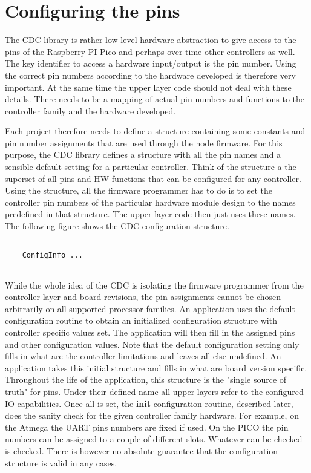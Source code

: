 \section{Configuring the pins}

The CDC library is rather low level hardware abstraction to give access to the pins of the Raspberry PI Pico and perhaps over time other controllers as well. The key identifier to access a hardware input/output is the pin number. Using the correct pin numbers according to the hardware developed is therefore very important. At the same time the upper layer code should not deal with these details. There needs to be a mapping of actual pin numbers and functions to the controller family and the hardware developed.

Each project therefore needs to define a structure containing some constants and pin number assignments that are used through the node firmware. For this purpose, the CDC library defines a structure with all the pin names and a sensible default setting for a particular controller. Think of the structure a the superset of all pins and HW functions that can be configured for any controller. Using the structure, all the firmware programmer has to do is to set the controller pin numbers of the particular hardware module design to the names predefined in that structure. The upper layer code then just uses these names. The following figure shows the CDC configuration structure.

\lstset{language=c++, style=codesnippetstyle}
\begin{lstlisting}
   
    ConfigInfo ...
    
\end{lstlisting}
\FloatBarrier

While the whole idea of the CDC is isolating the firmware programmer from the controller layer and board revisions, the pin assignments cannot be chosen arbitrarily on all supported processor families. An application uses the default configuration routine to obtain an initialized configuration structure with controller specific values set. The application will then fill in the assigned pins and other configuration values. Note that the default configuration setting only fills in what are the controller limitations and leaves all else undefined. An application takes this initial structure and fills in what are board version specific. Throughout the life of the application, this structure is the "single source of truth" for pins. Under their defined name all upper layers refer to the configured IO capabilities. Once all is set, the \textbf{init} configuration routine, described later, does the sanity check for the given controller family hardware. For example, on the Atmega the UART pins numbers are fixed if used. On the PICO the pin numbers can be assigned to a couple of different slots. Whatever can be checked is checked. There is however no absolute guarantee that the configuration structure is valid in any cases.

